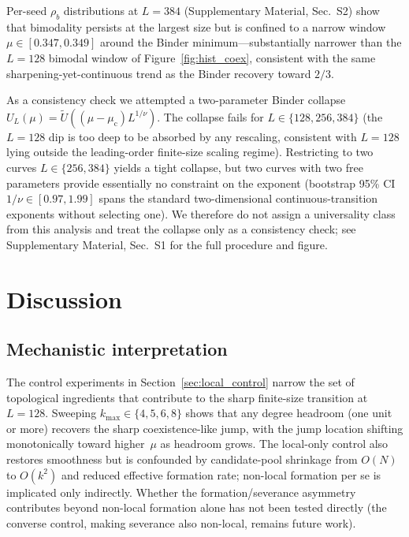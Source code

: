 \documentclass[preprint,12pt]{elsarticle}
\newcommand{\rb}{\rho_b}              %
\newcommand{\mc}{\mu_\mathrm{c}}      %
\newcommand{\Lsys}{L}                 %
\newcommand{\kmax}{k_{\max}}           %
\begin{document}
Per-seed $\rb$ distributions at $\Lsys = 384$
(Supplementary Material, Sec.~S2) show that bimodality
persists at the largest size but is confined to a narrow
window $\mu \in [0.347, 0.349]$ around the Binder
minimum---substantially narrower than the $\Lsys = 128$
bimodal window of Figure~\ref{fig:hist_coex}, consistent
with the same sharpening-yet-continuous trend as the
Binder recovery toward $2/3$.

As a consistency check we attempted a two-parameter Binder
collapse $U_\Lsys(\mu) = \tilde{U}((\mu - \mc)\Lsys^{1/\nu})$.
The collapse fails for $\Lsys \in \{128, 256, 384\}$ (the
$\Lsys = 128$ dip is too deep to be absorbed by any
rescaling, consistent with $\Lsys = 128$ lying outside the
leading-order finite-size scaling regime).
Restricting to two curves $\Lsys \in \{256, 384\}$ yields a
tight collapse, but two curves with two free parameters
provide essentially no constraint on the exponent (bootstrap
95\% CI $1/\nu \in [0.97, 1.99]$ spans the standard
two-dimensional continuous-transition exponents without
selecting one).
We therefore do not assign a universality class from this
analysis and treat the collapse only as a consistency check;
see Supplementary Material, Sec.~S1 for the full procedure
and figure.


\section{Discussion}
\label{sec:discussion}

\subsection{Mechanistic interpretation}
\label{sec:mechanism}

The control experiments in Section~\ref{sec:local_control}
narrow the set of topological ingredients that contribute
to the sharp finite-size transition at $\Lsys = 128$.
Sweeping $\kmax \in \{4, 5, 6, 8\}$ shows that any degree
headroom (one unit or more) recovers the sharp
coexistence-like jump, with the jump location shifting
monotonically toward higher~$\mu$ as headroom grows.
The local-only control also restores smoothness but is
confounded by candidate-pool shrinkage from $O(N)$ to
$O(k^2)$ and reduced effective formation rate;
non-local formation per se is implicated only indirectly.
Whether the formation/severance asymmetry contributes
beyond non-local formation alone has not been tested
directly (the converse control, making severance also
non-local, remains future work).
\end{document}
